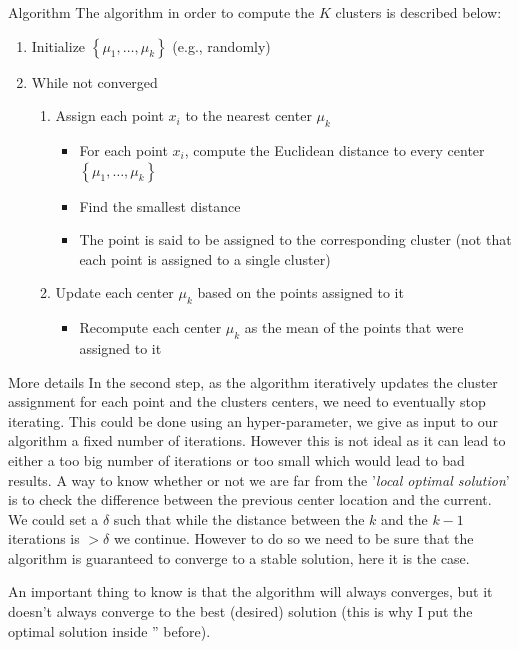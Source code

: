 \begin{parag}{Algorithm}
    The algorithm in order to compute the $K$ clusters is described below:
	\begin{enumerate}
	    \item Initialize $\left\{\mu_1, \ldots, \mu_k\right\}$ (e.g., randomly)
	    \item While not converged 
			\begin{enumerate}
			    \item Assign each point $x_i$ to the nearest center $\mu_k$ 
					\begin{itemize}
					    \item For each point $x_i$, compute the Euclidean distance to every center $\left\{\mu_1, \ldots, \mu_k\right\}$
					    \item Find the smallest distance
					    \item The point is said to be assigned to the corresponding cluster (not that each point is assigned to a single cluster)
					\end{itemize}
				\item Update each center $\mu_k$ based on the points assigned to it 
					\begin{itemize}
					    \item Recompute each center $\mu_k$ as the mean of the points that were assigned to it
					\end{itemize}
			\end{enumerate}
	\end{enumerate}
\end{parag}
\begin{parag}{More details}
    In the second step, as the algorithm iteratively updates the cluster assignment for each point and the clusters centers, we need to eventually stop iterating. This could be done using an hyper-parameter, we give as input to our algorithm a fixed number of iterations. However this is not ideal as it can lead to either a too big number of iterations or too small which would lead to bad results. A way to know whether or not we are far from the '\textit{local optimal solution}' is to check the difference between the previous center location and the current. We could set a $\delta$ such that while the distance between the $k$ and the $k-1$ iterations is $> \delta$ we continue. However to do so we need to be sure that the algorithm is guaranteed to converge to a stable solution, here it is the case.
\end{parag}
\begin{framedremark}
An important thing to know is that the algorithm will always converges, but it doesn't always converge to the best (desired) solution (this is why I put the optimal solution inside '' before).
\end{framedremark}

